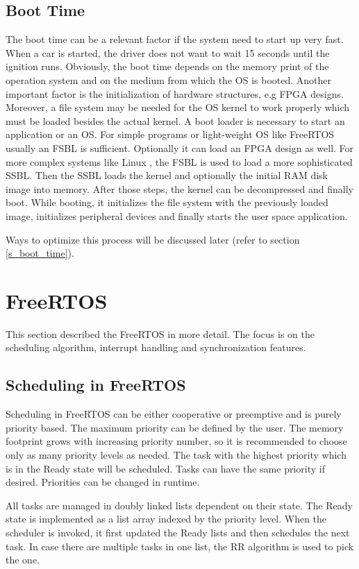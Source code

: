 \subsection{Boot Time}\label{ss_boot_time}
The boot time can be a relevant factor if the system need to start up very fast.
When a car is started, the driver does not want to wait 15 seconds until the ignition runs.
Obviously, the boot time depends on the memory print of the operation system and on the medium from which the \ac{OS} is booted.
Another important factor is the initialization of hardware structures, e.g \ac{FPGA} designs.
Moreover, a file system may be needed for the \ac{OS} kernel to work properly which must be loaded besides the actual kernel. 
A boot loader is necessary to start an application or an \ac{OS}.
For simple programs or light-weight \ac{OS} like FreeRTOS usually an \ac{FSBL} is sufficient.
Optionally it can load an \ac{FPGA} design as well.
For more complex systems like Linux \cite{jones:itlbp}, the \ac{FSBL} is used to load a more sophisticated \ac{SSBL}.
Then the \ac{SSBL} loads the kernel and optionally the initial RAM disk image into memory.
After those steps, the kernel can be decompressed and finally boot.
While booting, it initializes the file system with the previously loaded image, initializes peripheral devices and finally starts the user space application. 
\par
Ways to optimize this process will be discussed later (refer to section \ref{s_boot_time}).


\section{FreeRTOS}
This section described the FreeRTOS in more detail.
The focus is on the scheduling algorithm, interrupt handling and synchronization features.
\subsection{Scheduling in FreeRTOS}\label{ss_scheduling_in_freertos}
Scheduling in FreeRTOS \cite{freertos} can be either cooperative or preemptive and is purely priority based.
The maximum priority can be defined by the user. 
The memory footprint grows with increasing priority number, so it is recommended to choose only as many priority levels as needed.
The task with the highest priority which is in the Ready state will be scheduled. 
Tasks can have the same priority if desired.
Priorities can be changed in runtime.
\par
All tasks are managed in doubly linked lists dependent on their state. 
The Ready state is implemented as a list array indexed by the priority level. 
When the scheduler is invoked, it first updated the Ready lists and then schedules the next task.
In case there are multiple tasks in one list, the \ac{RR} algorithm is used to pick the one.
\par
[Picture Ready Queue] 

